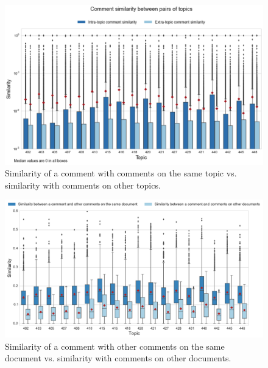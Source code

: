 \begin{figure}[tp]
  \centering
  \includegraphics[width=.9\linewidth]{figs/Intra-ExtraTopicSimilarity.png}
  \caption{Similarity of a comment with comments on the same
    topic vs. similarity with comments on other topics.
  \label{fig:simIntraExtraTopic}}
\end{figure}


\begin{figure}[tp]
  \centering
  \includegraphics[width=.9\linewidth]{figs/Intra-ExtraDocumentSimilarity.pdf}
  \caption{Similarity of a comment with other comments on the same
    document vs. similarity with comments on other documents.
  \label{fig:simIntraExtraDocument}}
\end{figure}


